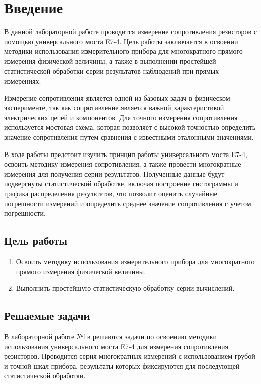  

\section{Введение}

В данной лабораторной работе проводится измерение сопротивления резисторов с помощью универсального моста E7-4. Цель работы заключается в освоении методики использования измерительного прибора для многократного прямого измерения физической величины, а также в выполнении простейшей статистической обработки серии результатов наблюдений при прямых измерениях.

Измерение сопротивления является одной из базовых задач в физическом эксперименте, так как сопротивление является важной характеристикой электрических цепей и компонентов. Для точного измерения сопротивления используется мостовая схема, которая позволяет с высокой точностью определить значение сопротивления путем сравнения с известными эталонными значениями.

В ходе работы предстоит изучить принцип работы универсального моста E7-4, освоить методику измерения сопротивления, а также провести многократные измерения для получения серии результатов. Полученные данные будут подвергнуты статистической обработке, включая построение гистограммы и графика распределения результатов, что позволит оценить случайные погрешности измерений и определить среднее значение сопротивления с учетом погрешности.

\subsection{Цель работы}

\begin{enumerate}
\item
    Освоить методику использования измерительного прибора для 
многократного прямого измерения физической величины. 
\item
Выполнить простейшую статистическую обработку серии вычислений.
\end{enumerate}
\subsection{Решаемые задачи}

В лабораторной работе №1в решаются задачи по освоению методики использования универсального моста E7-4 для измерения сопротивления резисторов. Проводится серия многократных измерений с использованием грубой и точной шкал прибора, результаты которых фиксируются для последующей статистической обработки.

